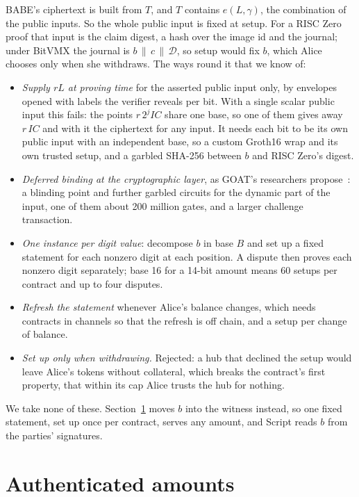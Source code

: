 \documentclass[11pt]{article}
\begin{document}
BABE's ciphertext is built from $T$, and $T$ contains $e(L, \gamma)$,
the combination of the public inputs. So the whole public input is fixed
at setup. For a RISC Zero proof that input is the claim digest, a hash
over the image id and the journal; under BitVMX the journal is
$b \,\|\, c \,\|\, \mathcal{D}$, so setup would fix $b$, which Alice chooses only
when she withdraws. The ways round it that we know of:
\begin{itemize}[leftmargin=1.5em]
\item \emph{Supply $rL$ at proving time} for the asserted public input
  only, by envelopes opened with labels the verifier reveals per bit.
  With a single scalar public input this fails: the points
  $r\,2^j\mathit{IC}$ share one base, so one of them gives away
  $r\,\mathit{IC}$ and with it the ciphertext for any input. It needs
  each bit to be its own public input with an independent base, so a
  custom Groth16 wrap and its own trusted setup, and a garbled SHA-256
  between $b$ and RISC Zero's digest.
\item \emph{Deferred binding at the cryptographic layer}, as GOAT's
  researchers propose~\cite{goat}: a blinding point and further garbled
  circuits for the dynamic part of the input, one of them about 200
  million gates, and a larger challenge transaction.
\item \emph{One instance per digit value}: decompose $b$ in base $B$ and
  set up a fixed statement for each nonzero digit at each position. A
  dispute then proves each nonzero digit separately; base 16 for a
  14-bit amount means 60 setups per contract and up to four disputes.
\item \emph{Refresh the statement} whenever Alice's balance changes,
  which needs contracts in channels so that the refresh is off chain,
  and a setup per change of balance.
\item \emph{Set up only when withdrawing.} Rejected: a hub that declined
  the setup would leave Alice's tokens without collateral, which breaks
  the contract's first property, that within its cap Alice trusts the
  hub for nothing.
\end{itemize}
We take none of these. Section~\ref{sec:auth} moves $b$ into the
witness instead, so one fixed statement, set up once per contract,
serves any amount, and Script reads $b$ from the parties' signatures.

\section{Authenticated amounts}
\label{sec:auth}
\end{document}
